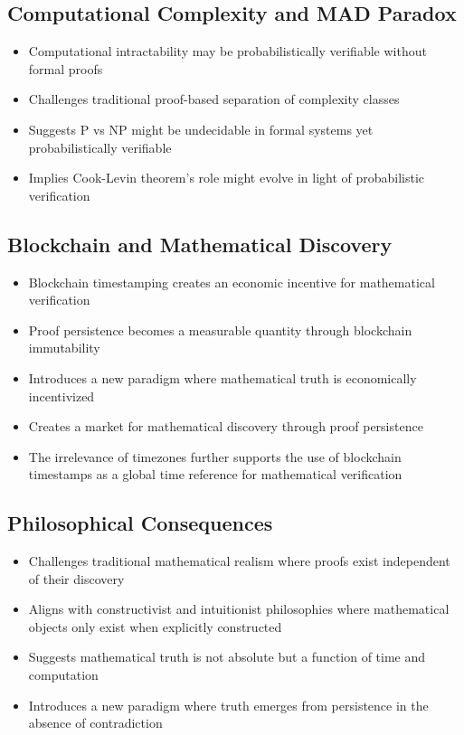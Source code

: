 \documentclass{article}
\begin{document}
\subsection{Computational Complexity and MAD Paradox}
\begin{itemize}
    \item Computational intractability may be probabilistically verifiable without formal proofs
    \item Challenges traditional proof-based separation of complexity classes
    \item Suggests P vs NP might be undecidable in formal systems yet probabilistically verifiable
    \item Implies Cook-Levin theorem's role might evolve in light of probabilistic verification
\end{itemize}

\subsection{Blockchain and Mathematical Discovery}
\begin{itemize}
    \item Blockchain timestamping creates an economic incentive for mathematical verification
    \item Proof persistence becomes a measurable quantity through blockchain immutability
    \item Introduces a new paradigm where mathematical truth is economically incentivized
    \item Creates a market for mathematical discovery through proof persistence
    \item The irrelevance of timezones \cite{Houk2017Timezones} further supports the use of blockchain timestamps as a global time reference for mathematical verification
\end{itemize}

\subsection{Philosophical Consequences}
\begin{itemize}
    \item Challenges traditional mathematical realism where proofs exist independent of their discovery
    \item Aligns with constructivist and intuitionist philosophies where mathematical objects only exist when explicitly constructed
    \item Suggests mathematical truth is not absolute but a function of time and computation
    \item Introduces a new paradigm where truth emerges from persistence in the absence of contradiction
\end{itemize}
\end{document}
